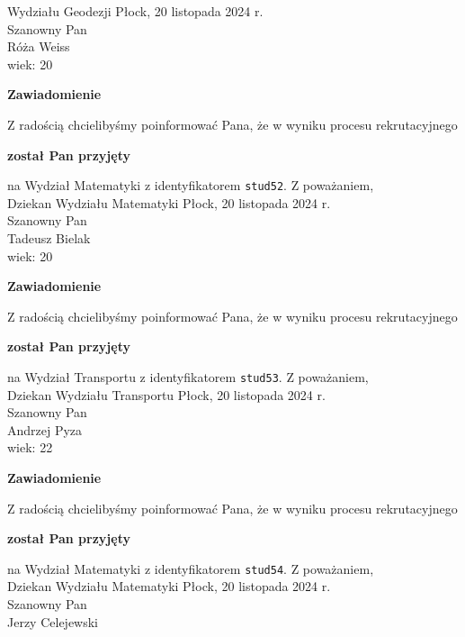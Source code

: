 \documentclass[12pt,a4paper]{article}
\begin{document}
Wydziału Geodezji
\newpage
\hfill Płock, 20 listopada 2024 r.\\
\noindent 
Szanowny Pan \\
Róża Weiss \\
wiek: 20
\bigskip
\begin{center}
 	{\Large\textbf{Zawiadomienie}}
\end{center}
\bigskip
Z radością chcielibyśmy poinformować Pana, że w wyniku procesu rekrutacyjnego 
\begin{center}
\textsf{\textbf{został Pan przyjęty}} 
\end{center}
na Wydział Matematyki z identyfikatorem \verb|stud52|. 
\vspace{2cm}
\noindent
Z poważaniem,\\
Dziekan
Wydziału Matematyki
\newpage
\hfill Płock, 20 listopada 2024 r.\\
\noindent 
Szanowny Pan \\
Tadeusz Bielak \\
wiek: 20
\bigskip
\begin{center}
 	{\Large\textbf{Zawiadomienie}}
\end{center}
\bigskip
Z radością chcielibyśmy poinformować Pana, że w wyniku procesu rekrutacyjnego 
\begin{center}
\textsf{\textbf{został Pan przyjęty}} 
\end{center}
na Wydział Transportu z identyfikatorem \verb|stud53|. 
\vspace{2cm}
\noindent
Z poważaniem,\\
Dziekan
Wydziału Transportu
\newpage
\hfill Płock, 20 listopada 2024 r.\\
\noindent 
Szanowny Pan \\
Andrzej Pyza \\
wiek: 22
\bigskip
\begin{center}
 	{\Large\textbf{Zawiadomienie}}
\end{center}
\bigskip
Z radością chcielibyśmy poinformować Pana, że w wyniku procesu rekrutacyjnego 
\begin{center}
\textsf{\textbf{został Pan przyjęty}} 
\end{center}
na Wydział Matematyki z identyfikatorem \verb|stud54|. 
\vspace{2cm}
\noindent
Z poważaniem,\\
Dziekan
Wydziału Matematyki
\newpage
\hfill Płock, 20 listopada 2024 r.\\
\noindent 
Szanowny Pan \\
Jerzy Celejewski \\
\end{document}
